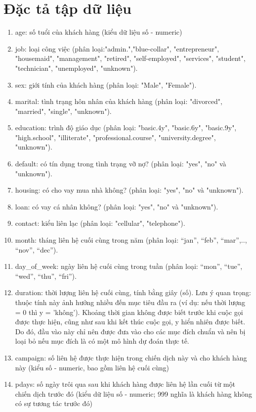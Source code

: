 \documentclass{report}
\begin{document}
\section{Đặc tả tập dữ liệu}
     \fontsize{13}{14}\selectfont
      \begin{enumerate}
        \item age: số tuổi của khách hàng (kiểu dữ liệu số - numeric)
        \item job: loại công việc (phân loại:"admin.","blue-collar", "entrepreneur", "housemaid", "management", "retired", "self-employed", "services", "student", "technician", "unemployed", "unknown").
        \item sex: giới tính của khách hàng (phân loại: "Male", "Female").
        \item marital: tình trạng hôn nhân của khách hàng (phân loại: "divorced", "married", "single", "unknown").
        \item education: trình độ giáo dục (phân loại: "basic.4y", "basic.6y", "basic.9y", "high.school", "illiterate", "professional.course", "university.degree", "unknown").
        \item default: có tín dụng trong tình trạng vỡ nợ? (phân loại: "yes",  "no" và "unknown").
        \item housing: có cho vay mua nhà không? (phân loại: "yes",  "no" và "unknown").
        \item loan: có vay cá nhân không? (phân loại: "yes",  "no" và "unknown").
        \item contact: kiểu liên lạc (phân loại: "cellular", "telephone").
        \item month: tháng liên hệ cuối cùng trong năm (phân loại: “jan”, “feb”, “mar”,.., “nov”, “dec”).
        \item day\_of\_week: ngày liên hệ cuối cùng trong tuần (phân loại: “mon”, “tue”, “wed”, “thu”, “fri”).
        \item duration: thời lượng liên hệ cuối cùng, tính bằng giây (số). Lưu ý quan trọng: thuộc tính này ảnh hưởng nhiều đến mục tiêu đầu ra (ví dụ: nếu thời lượng = 0 thì y = ’không’). Khoảng thời gian không được biết trước khi cuộc gọi được thực hiện, cũng như sau khi kết thúc cuộc gọi, y hiển nhiên được biết. Do đó, đầu vào này chỉ nên được đưa vào cho các mục đích chuẩn và nên bị loại bỏ nếu mục đích là có một mô hình dự đoán thực tế.
        \item campaign: số liên hệ được thực hiện trong chiến dịch này và cho khách hàng này (kiểu số - numeric, bao gồm liên hệ cuối cùng)
        \item pdays: số ngày trôi qua sau khi khách hàng được liên hệ lần cuối từ một chiến dịch trước đó (kiểu dữ liệu số - numeric; 999 nghĩa là khách hàng không có sự tương tác trước đó)

\end{enumerate}
\end{document}
